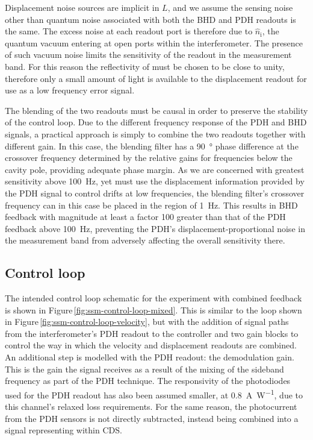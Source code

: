 Displacement noise sources are implicit in $L$, and we assume the sensing noise other than quantum noise associated with both the \gls{BHD} and \gls{PDH} readouts is the same. The excess noise at each readout port is therefore due to $\hat{n}_{\textrm{i}}$, the quantum vacuum entering at open ports within the interferometer. The presence of such vacuum noise limits the sensitivity of the readout in the measurement band. For this reason the reflectivity of \MNINE{} must be chosen to be close to unity, therefore only a small amount of light is available to the displacement readout for use as a low frequency error signal.

The blending of the two readouts must be causal in order to preserve the stability of the control loop. Due to the different frequency response of the \gls{PDH} and \gls{BHD} signals, a practical approach is simply to combine the two readouts together with different gain. In this case, the blending filter has a \SI{90}{\degree} phase difference at the crossover frequency determined by the relative gains for frequencies below the cavity pole, providing adequate phase margin. As we are concerned with greatest sensitivity above \SI{100}{\hertz}, yet must use the displacement information provided by the \gls{PDH} signal to control drifts at low frequencies, the blending filter's crossover frequency can in this case be placed in the region of \SI{1}{\hertz}. This results in \gls{BHD} feedback with magnitude at least a factor \num{100} greater than that of the \gls{PDH} feedback above \SI{100}{\hertz}, preventing the \gls{PDH}'s displacement-proportional noise in the measurement band from adversely affecting the overall sensitivity there.

\subsection{Control loop}
The intended control loop schematic for the experiment with combined feedback is shown in Figure\,\ref{fig:ssm-control-loop-mixed}. This is similar to the loop shown in Figure\,\ref{fig:ssm-control-loop-velocity}, but with the addition of signal paths from the interferometer's \gls{PDH} readout to the controller and two gain blocks to control the way in which the velocity and displacement readouts are combined. An additional step is modelled with the \gls{PDH} readout: the demodulation gain. This is the gain the signal receives as a result of the mixing of the sideband frequency as part of the \gls{PDH} technique. The responsivity of the photodiodes used for the \gls{PDH} readout has also been assumed smaller, at \SI{0.8}{\ampere\per\watt}, due to this channel's relaxed loss requirements. For the same reason, the photocurrent from the \gls{PDH} sensors is not directly subtracted, instead being combined into a signal representing \LMINUS{} within \gls{CDS}.


